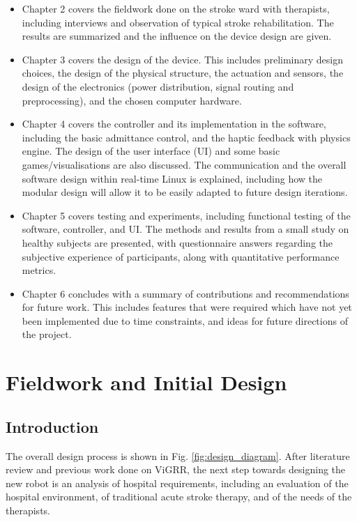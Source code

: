 \documentclass[12pt]{report}
\begin{document}
\begin{itemize}

\item Chapter 2 covers the fieldwork done on the stroke ward with therapists, including interviews and observation of typical stroke rehabilitation. The results are summarized and the influence on the device design are given. 

\item Chapter 3 covers the design of the device. This includes preliminary design choices, the design of the physical structure, the actuation and sensors, the design of the electronics (power distribution, signal routing and preprocessing), and the chosen computer hardware. 

\item Chapter 4 covers the controller and its implementation in the software, including the basic admittance control, and the haptic feedback with physics engine. The design of the user interface (UI) and some basic games/visualisations are also discussed. The communication and the overall software design within real-time Linux is explained, including how the modular design will allow it to be easily adapted to future design iterations. 

\item Chapter 5 covers testing and experiments, including functional testing of the software, controller, and UI. The methods and results from a small study on healthy subjects are presented, with questionnaire answers regarding the subjective experience of participants, along with quantitative performance metrics. 

\item Chapter 6 concludes with a summary of contributions and recommendations for future work. This includes features that were required which have not yet been implemented due to time constraints, and ideas for future directions of the project. 


\end{itemize}

\chapter{Fieldwork and Initial Design} 

\section{Introduction}

The overall design process is shown in Fig. \ref{fig:design_diagram}. After literature review and previous work done on ViGRR, the next step towards designing the new robot is an analysis of hospital requirements, including an evaluation of the hospital environment, of traditional acute stroke therapy, and of the needs of the therapists.
\end{document}

